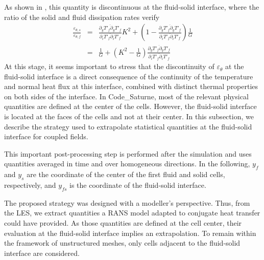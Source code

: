 \documentclass{svjour3}                     %
\begin{document}
As shown in \cite{flageul2017discontinuity}, this quantity is discontinuous at the fluid-solid interface, where the ratio of the solid and fluid dissipation rates verify
\begin{eqnarray}
\label{eq-def_discontinuity_eps}
\frac{\varepsilon_{\theta,s}}{\varepsilon_{\theta,f}} & = & \frac{\overline{\partial_y T'_f \partial_y T'_f}}{\overline{\partial_i T'_f \partial_i T'_f}} K^2 + \left(1-\frac{\overline{\partial_y T'_f \partial_y T'_f}}{\overline{\partial_i T'_f \partial_i T'_f}} \right) \frac{1}{G} \\
& = & \frac{1}{G} + \left( K^2 - \frac{1}{G} \right) \frac{\overline{\partial_y T'_f \partial_y T'_f}}{\overline{\partial_i T'_f \partial_i T'_f}} \nonumber
\end{eqnarray}
At this stage, it seems important to stress that the discontinuity of $\varepsilon_\theta$ at the fluid-solid interface is a direct consequence of the continuity of the temperature and normal heat flux at this interface, combined with distinct thermal properties on both sides of the interface.
In {\selectfont Code\_Saturne}, most of the relevant physical quantities are defined at the center of the cells.
However, the fluid-solid interface is located at the faces of the cells and not at their center.
In this subsection, we describe the strategy used to extrapolate statistical quantities at the fluid-solid interface for coupled fields.

This important post-processing step is performed after the simulation and uses quantities averaged in time and over homogeneous directions.
In the following, $y_f$ and $y_s$ are the coordinate of the center of the first fluid and solid cells, respectively, and $y_{fs}$ is the coordinate of the fluid-solid interface.

The proposed strategy was designed with a modeller's perspective.
Thus, from the LES, we extract quantities a RANS model adapted to conjugate heat transfer could have provided.
As those quantities are defined at the cell center, their evaluation at the fluid-solid interface implies an extrapolation.
To remain within the framework of unstructured meshes, only cells adjacent to the fluid-solid interface are considered.
\end{document}
